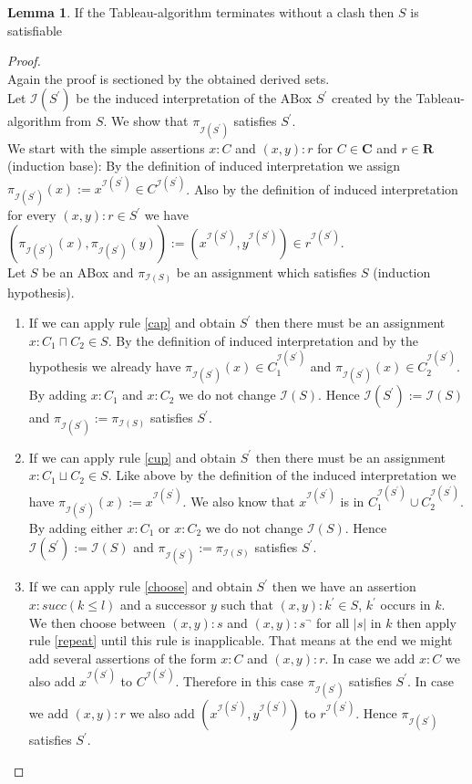 \documentclass[a4paper,11pt]{scrartcl}
\theoremstyle{break}
\theoremstyle{definition}
\newtheorem{mylem}{Lemma}
\begin{document}
\iffalse
\begin{mylem}
If the Tableau-algorithm terminates without a clash then $S$ is satisfiable
\end{mylem}
\begin{proof}$ $\\
Again the proof is sectioned by the obtained derived sets.\\
Let $\mathcal{I}(S^\prime)$ be the induced interpretation of the ABox $S^\prime$ created by the Tableau-algorithm from $S$. We show that $\pi_{\mathcal{I}(S^\prime)}$ satisfies $S^\prime$.\\
We start with the simple assertions $x:C$ and $(x,y):r$ for $C\in\mathbf{C}$ and $r\in\mathbf{R}$ (induction base): By the definition of induced interpretation we assign $\pi_{\mathcal{I}(S^\prime)}(x):=x^{\mathcal{I}(S^\prime)}\in C^{\mathcal{I}(S^\prime)}$. Also by the definition of induced interpretation for every $(x,y):r\in S^\prime$ we have $(\pi_{\mathcal{I}(S^\prime)}(x),\pi_{\mathcal{I}(S^\prime)}(y)):=(x^{\mathcal{I}(S^\prime)},y^{\mathcal{I}(S^\prime)})\in r^{\mathcal{I}(S^\prime)}$.\\
Let $S$ be an ABox and $\pi_{\mathcal{I}(S)}$ be an assignment which satisfies $S$ (induction hypothesis).\par
\begin{enumerate}
\item If we can apply rule \ref{cap} and obtain $S^\prime$ then there must be an assignment $x:C_1\sqcap C_2\in S$. By the definition of induced interpretation and by the hypothesis we already have $\pi_{\mathcal{I}(S^\prime)}(x)\in C_1^{\mathcal{I}(S^\prime)}$ and $\pi_{\mathcal{I}(S^\prime)}(x)\in C_2^{\mathcal{I}(S^\prime)}$. By adding $x:C_1$ and $x:C_2$ we do not change $\mathcal{I}(S)$. Hence $\mathcal{I}(S^\prime):=\mathcal{I}(S)$ and $\pi_{\mathcal{I}(S^\prime)}:=\pi_{\mathcal{I}(S)}$ satisfies $S^\prime$.
\item If we can apply rule \ref{cup} and obtain $S^\prime$ then there must be an assignment $x:C_1\sqcup C_2\in S$. Like above by the definition of the induced interpretation we have $\pi_{\mathcal{I}(S^\prime)}(x):=x^{\mathcal{I}(S^\prime)}$. We also know that $x^{\mathcal{I}(S^\prime)}$ is in $C_1^{\mathcal{I}(S^\prime)}\cup C_2^{\mathcal{I}(S^\prime)}$. By adding either $x:C_1$ or $x:C_2$ we do not change $\mathcal{I}(S)$. Hence $\mathcal{I}(S^\prime):=\mathcal{I}(S)$ and $\pi_{\mathcal{I}(S^\prime)}:=\pi_{\mathcal{I}(S)}$ satisfies $S^\prime$.
\item If we can apply rule \ref{choose} and obtain $S^\prime$ then we have an assertion $x:succ(k\leq l)$ and a successor $y$ such that $(x,y):k^\prime\in S$, $k^\prime$ occurs in $k$. We then choose between $(x,y):s$ and $(x,y):s^\neg$ for all $|s|$ in $k$ then apply rule \ref{repeat} until this rule is inapplicable. That means at the end we might add several assertions of the form $x:C$ and $(x,y):r$. In case we add $x:C$ we also add $x^{\mathcal{I}(S^\prime)}$ to $C^{\mathcal{I}(S^\prime)}$. Therefore in this case $\pi_{\mathcal{I}(S^\prime)}$ satisfies $S^\prime$. In case we add $(x,y):r$ we also add $(x^{\mathcal{I}(S^\prime)},y^{\mathcal{I}(S^\prime)})$ to $r^{\mathcal{I}(S^\prime)}$. Hence $\pi_{\mathcal{I}(S^\prime)}$ satisfies $S^\prime$.

\end{enumerate}
\end{proof}
\end{document}
